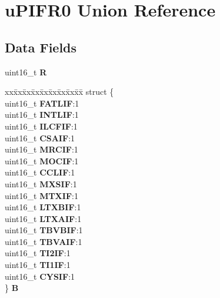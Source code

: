 \hypertarget{unionuPIFR0}{}\section{u\+P\+I\+F\+R0 Union Reference}
\label{unionuPIFR0}
\subsection*{Data Fields}
\begin{DoxyCompactItemize}
\item 
\mbox{\label{unionuPIFR0_a14133f973957e7825459e84699b425d8}} 
uint16\+\_\+t {\bfseries R}
\item 
\mbox{\label{unionuPIFR0_abe7b60d066f0e17293ac98d17efd0dac}} 
\begin{tabbing}
xx\=xx\=xx\=xx\=xx\=xx\=xx\=xx\=xx\=\kill
struct \{\\
\>uint16\_t {\bfseries FATLIF}:1\\
\>uint16\_t {\bfseries INTLIF}:1\\
\>uint16\_t {\bfseries ILCFIF}:1\\
\>uint16\_t {\bfseries CSAIF}:1\\
\>uint16\_t {\bfseries MRCIF}:1\\
\>uint16\_t {\bfseries MOCIF}:1\\
\>uint16\_t {\bfseries CCLIF}:1\\
\>uint16\_t {\bfseries MXSIF}:1\\
\>uint16\_t {\bfseries MTXIF}:1\\
\>uint16\_t {\bfseries LTXBIF}:1\\
\>uint16\_t {\bfseries LTXAIF}:1\\
\>uint16\_t {\bfseries TBVBIF}:1\\
\>uint16\_t {\bfseries TBVAIF}:1\\
\>uint16\_t {\bfseries TI2IF}:1\\
\>uint16\_t {\bfseries TI1IF}:1\\
\>uint16\_t {\bfseries CYSIF}:1\\
\} {\bfseries B}\\


\end{tabbing}
\end{DoxyCompactItemize}
